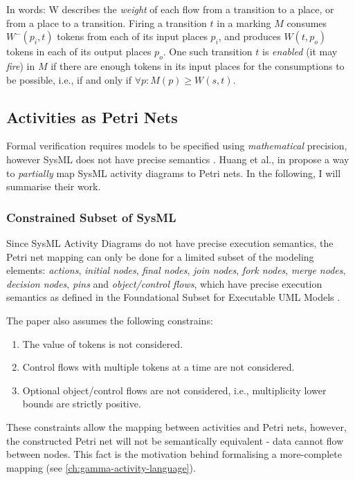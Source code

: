 In words: W describes the \emph{weight} of each flow from a transition to a place, or from a place to a transition. Firing a transition \(t\) in a marking \(M\) consumes \(W^-(p_i, t)\) tokens from each of its input places \(p_i\), and produces \(W(t, p_o)\) tokens in each of its output places \(p_o\). One such transition \(t\) is \emph{enabled} (it may \emph{fire}) in \(M\) if there are enough tokens in its input places for the consumptions to be possible, i.e., if and only if \( \forall p : M(p) \ge W(s, t)\).

\subsection{Activities as Petri Nets}\label{ssec:activities-as-petri-nets}

Formal verification requires models to be specified using \emph{mathematical} precision, however SysML does not have precise semantics \cite{pssm-testing, pssm, euml}. Huang et al., in \cite{https://doi.org/10.1002/sys.21524} propose a way to \emph{partially} map SysML activity diagrams to Petri nets. In the following, I will summarise their work.

\subsubsection{Constrained Subset of SysML}\label{ssec:sysml_assumptions}

Since SysML Activity Diagrams do not have precise execution semantics, the Petri net mapping can only be done for a limited subset of the modeling elements: \emph{actions}, \emph{initial nodes}, \emph{final nodes}, \emph{join nodes}, \emph{fork nodes}, \emph{merge nodes}, \emph{decision nodes}, \emph{pins} and \emph{object/control flows}, which have precise execution semantics as defined in the Foundational Subset for Executable UML Models \cite{fuml}.

The paper also assumes the following constrains:

\begin{enumerate}
	\item The value of tokens is not considered.
	\item Control flows with multiple tokens at a time are not considered.
	\item Optional object/control flows are not considered, i.e., multiplicity lower bounds are strictly positive.
\end{enumerate}

These constraints allow the mapping between activities and Petri nets, however, the constructed Petri net will not be semantically equivalent - data cannot flow between nodes. This fact is the motivation behind formalising a more-complete mapping (see \autoref{ch:gamma-activity-language}).

